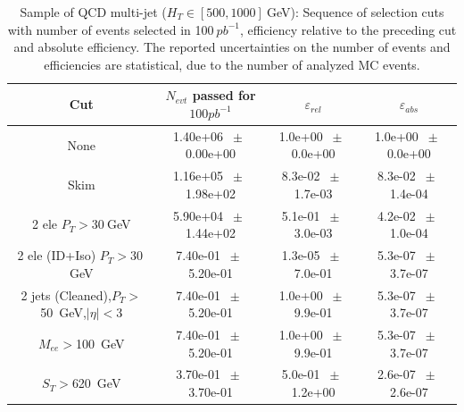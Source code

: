 \begin{table}[htbp] 
\begin{center} 
\begin{tabular}{|c|c|c|c|} 
\hline\hline 
 Cut & $N_{evt}$ passed for $100pb^{-1}$ & $\varepsilon_{rel}$ & $\varepsilon_{abs}$ \\ 
\hline\hline 
None       &        1.40e+06       $~\pm~$       0.00e+00        &        1.0e+00       $~\pm~$       0.0e+00        &        1.0e+00       $~\pm~$       0.0e+00       \\       
       Skim       &        1.16e+05       $~\pm~$       1.98e+02        &        8.3e-02       $~\pm~$       1.7e-03        &        8.3e-02       $~\pm~$       1.4e-04       \\       
       2 ele $P_T>30~$GeV       &        5.90e+04       $~\pm~$       1.44e+02        &        5.1e-01       $~\pm~$       3.0e-03        &        4.2e-02       $~\pm~$       1.0e-04       \\       
       2 ele (ID+Iso) $P_T>30~$GeV       &        7.40e-01       $~\pm~$       5.20e-01        &        1.3e-05       $~\pm~$       7.0e-01        &        5.3e-07       $~\pm~$       3.7e-07       \\       
       2 jets (Cleaned),$P_T>$50~GeV,$|\eta|<$3       &        7.40e-01       $~\pm~$       5.20e-01        &        1.0e+00       $~\pm~$       9.9e-01        &        5.3e-07       $~\pm~$       3.7e-07       \\       
       $M_{ee}>$100~GeV       &        7.40e-01       $~\pm~$       5.20e-01        &        1.0e+00       $~\pm~$       9.9e-01        &        5.3e-07       $~\pm~$       3.7e-07       \\       
       $S_T>$620~GeV       &        3.70e-01       $~\pm~$       3.70e-01        &        5.0e-01       $~\pm~$       1.2e+00        &        2.6e-07       $~\pm~$       2.6e-07       \\       
       \hline\hline 
\end{tabular} 
\end{center} 
\caption{Sample of QCD multi-jet ($H_T \in [500,1000]~$GeV): Sequence of selection cuts with number of events selected in 100$~pb^{-1}$, efficiency relative to the preceding cut and absolute efficiency. The reported uncertainties on the number of events and efficiencies are statistical, due to the number of analyzed MC events.} 
\label{tab:effic-QCD-500-1000} 
\end{table} 

